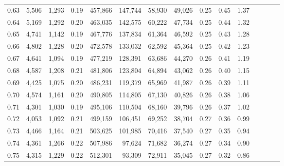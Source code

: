 \begin{tabular}{rrrcrrrrrrrrrrr}
0.63 &   5,506 &   1,293 &                                       0.19 &  457,866 &  147,744 &   58,930 &   49,026 &  0.25 &  0.45 &                         1.37 \\
0.64 &   5,169 &   1,292 &                                       0.20 &  463,035 &  142,575 &   60,222 &   47,734 &  0.25 &  0.44 &                         1.32 \\
0.65 &   4,741 &   1,142 &                                       0.19 &  467,776 &  137,834 &   61,364 &   46,592 &  0.25 &  0.43 &                         1.28 \\
0.66 &   4,802 &   1,228 &                                       0.20 &  472,578 &  133,032 &   62,592 &   45,364 &  0.25 &  0.42 &                         1.23 \\
0.67 &   4,641 &   1,094 &                                       0.19 &  477,219 &  128,391 &   63,686 &   44,270 &  0.26 &  0.41 &                         1.19 \\
0.68 &   4,587 &   1,208 &                                       0.21 &  481,806 &  123,804 &   64,894 &   43,062 &  0.26 &  0.40 &                         1.15 \\
0.69 &   4,425 &   1,075 &                                       0.20 &  486,231 &  119,379 &   65,969 &   41,987 &  0.26 &  0.39 &                         1.11 \\
0.70 &   4,574 &   1,161 &                                       0.20 &  490,805 &  114,805 &   67,130 &   40,826 &  0.26 &  0.38 &                         1.06 \\
0.71 &   4,301 &   1,030 &                                       0.19 &  495,106 &  110,504 &   68,160 &   39,796 &  0.26 &  0.37 &                         1.02 \\
0.72 &   4,053 &   1,092 &                                       0.21 &  499,159 &  106,451 &   69,252 &   38,704 &  0.27 &  0.36 &                         0.99 \\
0.73 &   4,466 &   1,164 &                                       0.21 &  503,625 &  101,985 &   70,416 &   37,540 &  0.27 &  0.35 &                         0.94 \\
0.74 &   4,361 &   1,266 &                                       0.22 &  507,986 &   97,624 &   71,682 &   36,274 &  0.27 &  0.34 &                         0.90 \\
0.75 &   4,315 &   1,229 &                                       0.22 &  512,301 &   93,309 &   72,911 &   35,045 &  0.27 &  0.32 &                         0.86 \\

\end{tabular}
